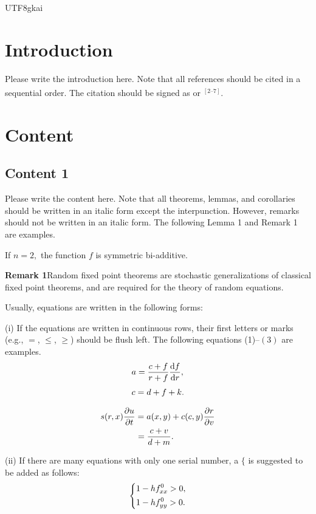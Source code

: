 \documentclass[a4paper, 11pt, twoside]{article}
\newcommand{\supercite}[1]{\!\!\textsuperscript{\cite{#1}}} %
\begin{document}
\begin{CJK*}{UTF8}{gkai}
\section{Introduction}
\small Please write the introduction here. Note that all
 references should be cited in a sequential order. The citation should be signed as \supercite{1} or
$^{[2\textrm{--}7]}$.

\section{Content}
\subsection{Content 1}
  Please write the content here. Note that all theorems, lemmas, and
corollaries should be written in an italic form except the
interpunction. However,  remarks should not be written in  an italic
form. The following Lemma 1 and Remark 1 are examples.


\begin{Dingli}[Lemma 1]
If $n=2,$ the function $f$ is symmetric bi-additive.
\end{Dingli}

\textbf{Remark 1}\quad   Random fixed point theorems are stochastic
generalizations of classical fixed point theorems, and are required
for the theory of random equations.

Usually, equations are written in the following forms:

(i) If the equations are written in continuous rows, their first
letters or marks (e.g., $=$, $\leqslant$, $\geqslant$) should be
flush left. The following equations (1)$\textrm{--}(3)$ are
examples.
\begin{align}%
&a=\frac{c+f}{r+f}\frac{{\rm d} f}{{\rm d}r},\\[1mm]
&c=d+f+k.
\end{align}

\begin{align}%
&s(r,x)\frac{\partial u}{\partial
t}=a(x,y)+c(c,y)\frac{\partial r}{\partial v}\nonumber\\
&\hspace{14.5mm}=\frac{c+v}{d+m}.
\end{align}

(ii) If there are many equations with only one serial number, a $\{$
is suggested to be added as follows:
\begin{align}%
 \left \{\aligned
 &1-hf^{0}_{xx}>0,\\
 &1-hf^{0}_{yy}>0.
 \endaligned
 \right.
 \end{align}



\end{CJK*}
\end{document}
